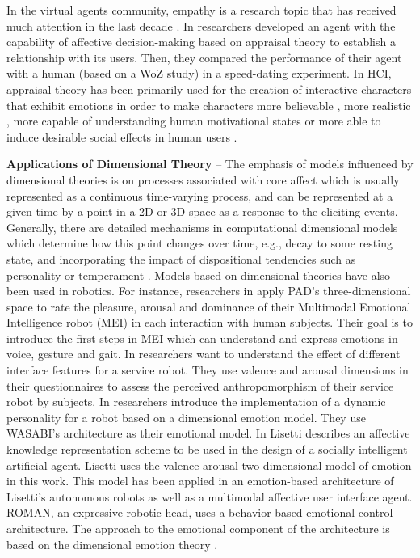 \documentclass[12pt]{report}
\begin{document}
In the virtual agents community, empathy is a research topic that has received
much attention in the last decade \cite{brave:emotion-hci}
\cite{scott:modeling-empathy-agent} \cite{paiva:agent-care}
\cite{prendinger:empathic-companion} \cite{bickmore:longterm-relationship}. In
\cite{pontier:women-robot-men} researchers developed an agent with the
capability of affective decision-making based on appraisal theory to establish a
relationship with its users. Then, they compared the performance of their agent
with a human (based on a WoZ study) in a speed-dating experiment. In HCI,
appraisal theory has been primarily used for the creation of interactive
characters that exhibit emotions in order to make characters more believable
\cite{neal:believable-agents}, more realistic \cite{mao:social-causality}
\cite{traum:negotiation-teams-training}, more capable of understanding human
motivational states \cite{conati:evaluating-student-affect} or more able to
induce desirable social effects in human users \cite{paiva:learning-feeling}.

\textbf{Applications of Dimensional Theory} -- The emphasis of models influenced
by dimensional theories is on processes associated with core affect which is
usually represented as a continuous time-varying process, and can be represented
at a given time by a point in a 2D or 3D-space as a response to the eliciting
events. Generally, there are detailed mechanisms in computational dimensional
models which determine how this point changes over time, e.g., decay to some
resting state, and incorporating the impact of dispositional tendencies such as
personality or temperament \cite{gebhard:alma}
\cite{marsella:computational-models}. Models based on dimensional theories have
also been used in robotics. For instance, researchers in
\cite{lim:mei-motherese-ei} apply PAD's three-dimensional space to rate the
pleasure, arousal and dominance of their Multimodal Emotional Intelligence robot
(MEI) in each interaction with human subjects. Their goal is to introduce the
first steps in MEI which can understand and express emotions in voice, gesture
and gait. In \cite{zhang:service-robot-dimensional} researchers want to
understand the effect of different interface features for a service robot. They
use valence and arousal dimensions in their questionnaires to assess the
perceived anthropomorphism of their service robot by subjects. In
\cite{klug:emotion-based-hri} researchers introduce the implementation of a
dynamic personality for a robot based on a dimensional emotion model. They use
WASABI's architecture \cite{becker:wasabi,becker:wasabi-description} as their
emotional model. In \cite{lisetti:affect-socially-intelligent} Lisetti describes
an affective knowledge representation scheme to be used in the design of a
socially intelligent artificial agent. Lisetti uses the valence-arousal two
dimensional model of emotion in this work. This model has been applied in an
emotion-based architecture of Lisetti's autonomous robots as well as a
multimodal affective user interface agent. ROMAN, an expressive robotic head,
uses a behavior-based emotional control architecture. The approach to the
emotional component of the architecture is based on the dimensional emotion
theory \cite{hirth:roman}.
\end{document}
